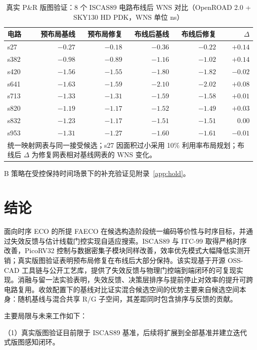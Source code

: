 \documentclass[twocolumn,10pt]{ctexart}
\begin{document}
\begin{table}[tbp]
\centering
\caption{真实 P\&R 版图验证：8 个 ISCAS89 电路布线后 WNS 对比（OpenROAD 2.0 + SKY130 HD PDK，WNS 单位 ns）}
\label{tab:pr8}
\footnotesize
\setlength{\tabcolsep}{2pt}
\begin{tabular}{lrrrrr}
\toprule
\textbf{电路} & \textbf{预布局基线} & \textbf{预布局修复} & \textbf{布线后基线} & \textbf{布线后修复} & $\Delta$ \\
\midrule
s27  & $-0.27$ & $-0.18$ & $-0.36$ & $-0.22$ & $+0.14$ \\
s382 & $-0.98$ & $-0.89$ & $-1.16$ & $-1.02$ & $+0.14$ \\
s420 & $-1.56$ & $-1.55$ & $-1.80$ & $-1.82$ & $-0.02$ \\
s641 & $-1.63$ & $-1.59$ & $-2.10$ & $-2.02$ & $+0.08$ \\
s713 & $-1.33$ & $-1.31$ & $-1.59$ & $-1.58$ & $+0.01$ \\
s820 & $-1.19$ & $-1.17$ & $-1.52$ & $-1.49$ & $+0.03$ \\
s832 & $-1.23$ & $-1.17$ & $-1.51$ & $-1.51$ & $0.00$ \\
s953 & $-1.31$ & $-1.27$ & $-1.60$ & $-1.61$ & $-0.01$ \\
\bottomrule
\multicolumn{6}{p{0.92\columnwidth}}{\footnotesize 统一映射网表与同一接受候选；s27 因面积过小采用 10\% 利用率布局规划；布线后 $\Delta$ 为修复网表相对基线网表的 WNS 变化。}\\
\end{tabular}
\end{table}

B 策略在受控保持时间场景下的补充验证见附录~\ref{app:hold}。
\section{结论}\label{sec:conclusion}

面向时序 ECO 的所提 FAECO 在候选构造阶段统一编码等价性与时序目标，并通过失效反馈与估计线载门控实现自适应搜索。ISCAS89 与 ITC-99 取得严格时序改善，PicoRV32 控制与数据密集子模块同样改善，效率优先模式大幅降低实测开销；真实版图验证表明预布局修复在布线后大部分保持。该实现基于开源 OSS-CAD 工具链与公开工艺库，提供了失效反馈与物理门控端到端闭环的可复现实现。消融与留一法实验表明，失效反馈、决策层排序与提前停止对效率的提升可跨电路复用。收敛配置下的基线对比证实混合候选空间的优势主要来自候选空间本身：随机基线与混合共享 R/G 子空间，其差距同时包含排序与反馈的贡献。

主要局限与未来工作如下：

（1）真实版图验证目前限于 ISCAS89 基准，后续将扩展到全部基准并建立迭代式版图感知闭环。
\end{document}

